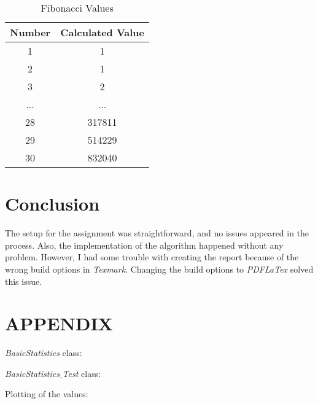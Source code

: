 \documentclass[10pt, a4paper, twocolumn]{article} %
\begin{document}
\begin{table}[h]
         \label{tab:fibonacciValuesTable}
	\caption{Fibonacci Values}
	\centering
	\begin{tabular}{c c}
		\toprule
		Number & Calculated Value \\
		\midrule
		1 & 1 \\
		2 & 1 \\
		3 & 2 \\
		... & ... \\
		28 & 317811 \\
		29 & 514229 \\
		30 & 832040 \\
		\bottomrule
	\end{tabular}
\end{table}


\section{Conclusion}
The setup for the assignment was straightforward, and no issues appeared in the process. Also, the implementation of the algorithm happened without any problem. However, I had some trouble with creating the report because of the wrong build options in \textit{Texmark}. Changing the build options to \textit{PDFLaTex} solved this issue. 

\newpage

\section*{APPENDIX}

\textit{BasicStatistics} class: 

\newpage

\textit{BasicStatistics$\_$Test} class: 

\newpage

Plotting of the values:






\printbibliography[title={Bibliography}] %

\end{document}
